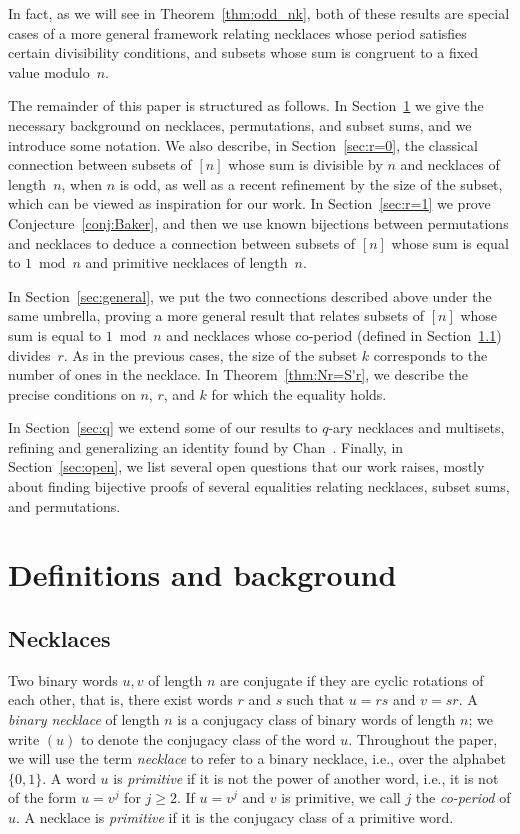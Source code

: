 \documentclass[12pt]{article}
\theoremstyle{definition}
\begin{document}
In fact, as we will see in Theorem~\ref{thm:odd_nk}, both of these results are special cases of a
more general framework relating necklaces whose period satisfies certain
divisibility conditions, and subsets whose sum is congruent to a fixed value
modulo~$n$.

The remainder of this paper is structured as follows. In Section~\ref{sec:definitions} we give the necessary background on necklaces, permutations, and subset sums, and we introduce some notation. We also describe, in Section~\ref{sec:r=0}, the classical connection between subsets of $[n]$ whose sum is divisible by $n$ and necklaces of length~$n$, when $n$ is odd, as well as a recent refinement by the size of the subset, which can be viewed as inspiration for our work.
In Section~\ref{sec:r=1} we prove Conjecture~\ref{conj:Baker}, and then we use known bijections between permutations and necklaces to deduce a connection between subsets of $[n]$ whose sum is equal to $1\bmod n$ and primitive necklaces of length~$n$.

In Section~\ref{sec:general}, we put the two connections described above under the same umbrella, proving a more general result that relates subsets of $[n]$ whose sum is equal to $1\bmod n$ and necklaces whose co-period (defined in Section~\ref{sec:necklaces}) divides~$r$. As in the previous cases, the size of the subset $k$ corresponds to the number of ones in the necklace. In Theorem~\ref{thm:Nr=S'r}, we describe the precise conditions on $n$, $r$, and $k$ for which the equality holds.

In Section~\ref{sec:q} we extend some of our results to $q$-ary necklaces and multisets, refining and generalizing an identity found by Chan~\cite{Chan}.
Finally, in Section~\ref{sec:open}, we list several open questions that our work raises, mostly about finding bijective proofs of several equalities relating necklaces, subset sums, and permutations.


\section{Definitions and background}
\label{sec:definitions}

\subsection{Necklaces}\label{sec:necklaces}

Two binary words $u,v$ of length $n$ are conjugate if they are cyclic rotations of each other, that is, there exist words $r$ and $s$ such that $u=rs$ and $v=sr$. A {\em binary necklace} of length $n$ is a conjugacy class of binary words of length $n$; we write $(u)$ to denote the conjugacy class of the word $u$. Throughout the paper, we will use the term {\em necklace} to refer to a binary necklace, i.e., over the alphabet $\{0,1\}$.  A word $u$ is {\em primitive} if it is not the power of another word, i.e., it is not of the form $u=v^j$ for $j\ge2$. If $u=v^j$ and $v$ is primitive, we call $j$ the {\em co-period} of $u$.
A necklace is {\em primitive} if it is the conjugacy class of a primitive word.
\end{document}
